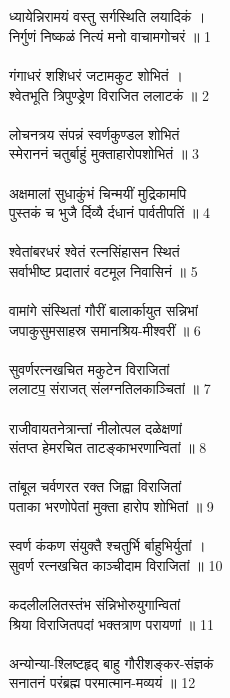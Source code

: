 \section{}
ध्यायेन्निरामयं वस्तु सर्गस्थिति लयादिकं ।\\
निर्गुणं निष्कळं नित्यं मनो वाचामगोचरं ॥ 1\\
\\
गंगाधरं शशिधरं जटामकुट शोभितं ।\\
श्वेतभूति त्रिपुण्ड्रेण विराजित ललाटकं ॥ 2\\
\\
लोचनत्रय संपन्नं स्वर्णकुण्डल शोभितं\\
स्मेराननं चतुर्बाहुं मुक्ताहारोपशोभितं ॥ 3\\
\\
अक्षमालां सुधाकुंभं चिन्मयीं मुद्रिकामपि\\
पुस्तकं च भुजै र्दिव्यै र्दधानं पार्वतीपतिं ॥ 4\\
\\
श्वेतांबरधरं श्वेतं रत्नसिंहासन स्थितं\\
सर्वाभीष्ट प्रदातारं वटमूल निवासिनं ॥ 5\\
\\
वामांगे संस्थितां गौरीं बालार्कायुत सन्निभां\\
जपाकुसुमसाहस्र समानश्रिय-मीश्वरीं ॥ 6\\
\\
सुवर्णरत्नखचित मकुटेन विराजितां\\
ललाटप॒ संराजत् संलग्नतिलकाञ्चितां ॥ 7\\
\\
राजीवायतनेत्रान्तां नीलोत्पल दळेक्षणां\\
संतप्त हेमरचित ताटङ्काभरणान्वितां ॥ 8\\
\\
तांबूल चर्वणरत रक्त जिह्वा विराजितां\\
पताका भरणोपेतां मुक्ता हारोप शोभितां ॥ 9\\
\\
स्वर्ण कंकण संयुक्तै श्चतुर्भि र्बाहुभिर्युतां ।\\
सुवर्ण रत्नखचित काञ्चीदाम विराजितां ॥ 10\\
\\
कदलीललितस्तंभ संन्निभोरुयुगान्वितां\\
श्रिया विराजितपदां भक्तत्राण परायणां ॥ 11\\
\\
अन्योन्या-श्लिष्टहृद् बाहु गौरीशङ्कर-संज्ञकं\\
सनातनं परंब्रह्म परमात्मान-मव्ययं ॥ 12\\
